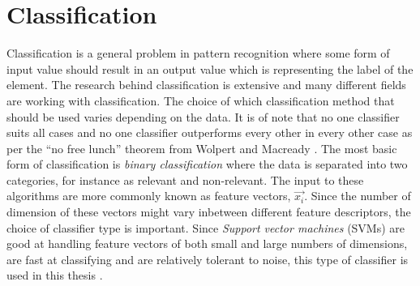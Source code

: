 \section{Classification}

Classification is a general problem in pattern recognition where some form of input value should result in an output value which is representing the label of the element. The research behind classification is extensive and many different fields are working with classification. The choice of which classification method that should be used varies depending on the data. It is of note that no one classifier suits all cases and no one classifier outperforms every other in every other case as per the ``no free lunch'' theorem from Wolpert and Macready \cite{nflTheorem}. The most basic form of classification is \emph{binary classification} where the data is separated into two categories, for instance as relevant and non-relevant. The input to these algorithms are more commonly known as feature vectors, $\vec{x_i}$. Since the number of dimension of these vectors might vary inbetween different feature descriptors, the choice of classifier type is important. Since \emph{Support vector machines} (SVMs) are good at handling feature vectors of both small and large numbers of dimensions, are fast at classifying and are relatively tolerant to noise, this type of classifier is used in this thesis \cite{kotsiantis2007supervised}\cite{kadam2016study}. 

